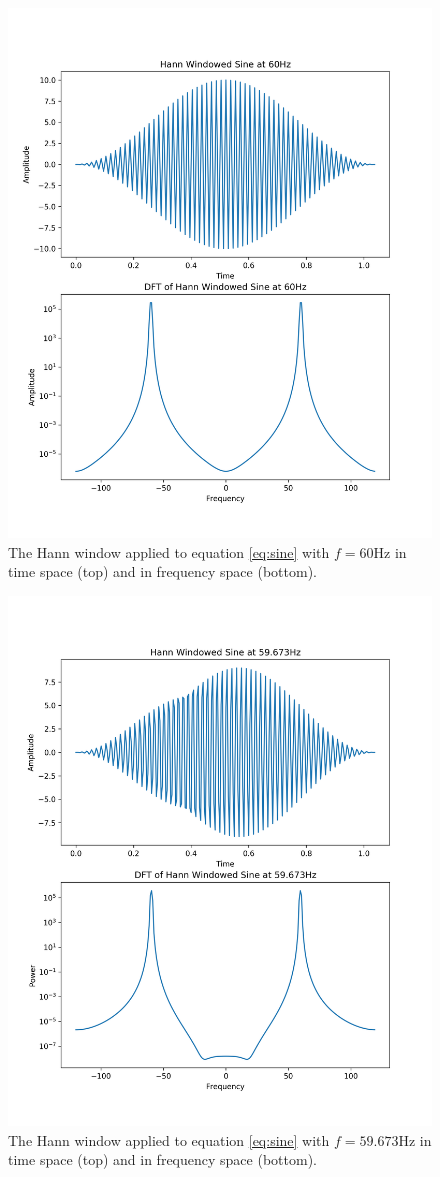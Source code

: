 \message{ !name(austin_report.tex)}\documentclass[11pt, letterpage]{article}
\begin{document}
\begin{figure}
  \includegraphics[width=\linewidth]{hann_0.png}
  \caption{
    The Hann window applied to equation \ref{eq:sine} with $f = 60$Hz in time
    space (top) and in frequency space (bottom).
  }
  \label{fig:hann_0}
\end{figure}

\begin{figure}
  \includegraphics[width=\linewidth]{hann_1.png}
  \caption{
    The Hann window applied to equation \ref{eq:sine} with $f = 59.673$Hz in
    time space (top) and in frequency space (bottom).
  }
  \label{fig:hann_1}
\end{figure}
\end{document}
